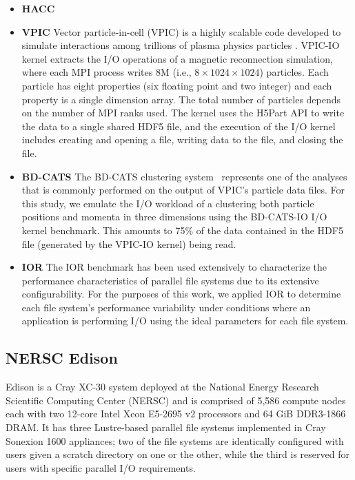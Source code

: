 \begin{itemize}
\item \textbf{HACC} 
\item \textbf{VPIC} 
Vector particle-in-cell (VPIC) is a highly scalable code developed to simulate
interactions among trillions of plasma physics particles  \cite{Bowers2008}.
VPIC-IO kernel extracts the I/O operations of a magnetic reconnection
simulation, where each MPI process writes 8M (i.e., $8 \times 1024 \times 1024$) particles. Each
particle has eight properties (six floating point and two integer) and each
property is a single dimension array. The total number of particles depends on
the number of MPI ranks used. The kernel uses the H5Part API \cite{H5Part} to write
the data to a single shared HDF5 file, and the execution of the I/O kernel includes
creating and opening a file, writing data to the file, and closing the file.

\item \textbf{BD-CATS} The BD-CATS clustering system~\cite{Patwary2015}  represents
one of the analyses that is commonly performed on the output of VPIC's particle data files.
For this study, we emulate the I/O workload of a clustering both particle
positions and momenta in three dimensions using the BD-CATS-IO I/O kernel benchmark.  This amounts to 75\% of the data
contained in the HDF5 file (generated by the VPIC-IO kernel) being read.

\item \textbf{IOR} The IOR benchmark has been used extensively
to characterize the performance characteristics of parallel file systems\cite{Yildiz2016,Xie2012,Lofstead2010,Uselton2010}
due to its extensive configurability.  For the purposes of this work, we applied
IOR to determine each file system's performance variability under conditions
where an application is performing I/O using the ideal parameters for each
file system.

\end{itemize}

\subsection{NERSC Edison} \label{sec:platforms/edison}

Edison is a Cray XC-30 system deployed at the National Energy Research Scientific Computing Center (NERSC) and is comprised of 5,586 compute nodes each with two 12-core Intel Xeon E5-2695 v2 processors and 64 GiB DDR3-1866 DRAM.
It has three Lustre-based parallel file systems implemented in Cray Sonexion 1600 appliances; two of the file systems are identically configured with users given a scratch directory on one or the other, while the third is reserved for users with specific parallel I/O requirements.

